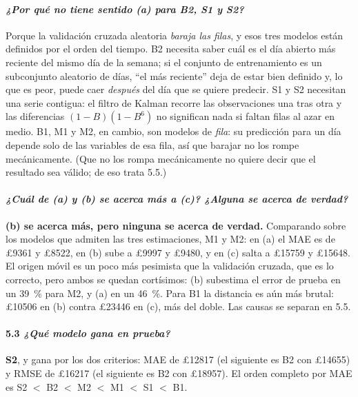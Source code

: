 \documentclass[11pt]{article}
\newcommand{\gbp}{\pounds}
\begin{document}
\paragraph{{\normalfont\itshape ¿Por qu\'e no tiene sentido (a) para B2, S1
y S2?}} Porque la validaci\'on cruzada aleatoria \emph{baraja las filas}, y
esos tres modelos est\'an definidos por el orden del tiempo. B2 necesita
saber cu\'al es el d\'ia abierto m\'as reciente del mismo d\'ia de la
semana; si el conjunto de entrenamiento es un subconjunto aleatorio de d\'ias,
``el m\'as reciente'' deja de estar bien definido y, lo que es peor, puede
caer \emph{despu\'es} del d\'ia que se quiere predecir. S1 y S2 necesitan una
serie contigua: el filtro de Kalman recorre las observaciones una tras otra
y las diferencias $(1-B)(1-B^6)$ no significan nada si faltan filas al azar
en medio. B1, M1 y M2, en cambio, son modelos de \emph{fila}: su predicci\'on
para un d\'ia depende solo de las variables de esa fila, as\'i que barajar no
los rompe mec\'anicamente. (Que no los rompa mec\'anicamente no quiere decir
que el resultado sea v\'alido; de eso trata 5.5.)

\paragraph{{\normalfont\itshape ¿Cu\'al de (a) y (b) se acerca m\'as a (c)?
¿Alguna se acerca de verdad?}} \textbf{(b) se acerca m\'as, pero ninguna se
acerca de verdad.} Comparando sobre los modelos que admiten las tres
estimaciones, M1 y M2: en (a) el MAE es de \gbp\num{9361} y \gbp\num{8522},
en (b) sube a \gbp\num{9997} y \gbp\num{9480}, y en (c) salta a
\gbp\num{15759} y \gbp\num{15648}. El origen m\'ovil es un poco m\'as
pesimista que la validaci\'on cruzada, que es lo correcto, pero ambos se
quedan cort\'isimos: (b) subestima el error de prueba en un
\SI{39}{\percent} para M2, y (a) en un \SI{46}{\percent}. Para B1 la
distancia es a\'un m\'as brutal: \gbp\num{10506} en (b) contra
\gbp\num{23446} en (c), m\'as del doble. Las causas se separan en 5.5.

\paragraph{5.3 {\normalfont\itshape ¿Qu\'e modelo gana en prueba?}}
\textbf{S2}, y gana por los dos criterios: MAE de \gbp\num{12817} (el
siguiente es B2 con \gbp\num{14655}) y RMSE de \gbp\num{16217} (el siguiente
es B2 con \gbp\num{18957}). El orden completo por MAE es S2 $<$ B2 $<$ M2
$<$ M1 $<$ S1 $<$ B1.
\end{document}
